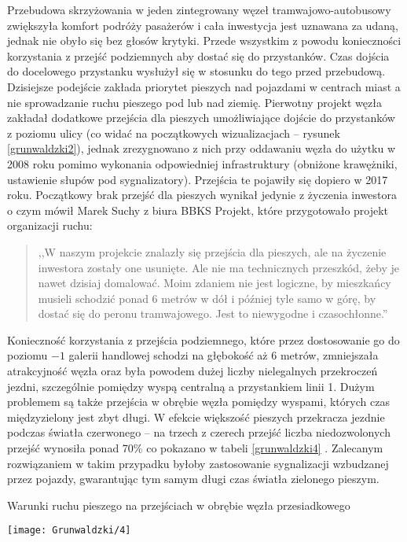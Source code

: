 \documentclass[twoside,12pt]{article}
\begin{document}
	Przebudowa skrzyżowania w jeden zintegrowany węzeł tramwajowo-autobusowy zwiększyła komfort podróży pasażerów i cała inwestycja jest uznawana za udaną, jednak nie obyło się bez głosów krytyki. Przede wszystkim z powodu konieczności korzystania z przejść podziemnych aby dostać się do przystanków. Czas dojścia do docelowego przystanku wysłużył się w stosunku do tego przed przebudową. Dzisiejsze podejście zakłada priorytet pieszych nad pojazdami w centrach miast a nie sprowadzanie ruchu pieszego pod lub nad ziemię. Pierwotny projekt węzła zakładał dodatkowe przejścia dla pieszych umożliwiające dojście do przystanków z poziomu ulicy (co widać na początkowych wizualizacjach -- rysunek \ref{grunwaldzki2}), jednak zrezygnowano z nich przy oddawaniu węzła do użytku w 2008 roku pomimo wykonania odpowiedniej infrastruktury (obniżone krawężniki, ustawienie słupów pod sygnalizatory). Przejścia te pojawiły się dopiero w 2017 roku. Początkowy brak przejść dla pieszych wynikał jedynie z życzenia inwestora o czym mówił Marek Suchy z biura BBKS Projekt, które przygotowało projekt organizacji ruchu:
	\begin{quote}
	,,W naszym projekcie znalazły się przejścia dla pieszych, ale na życzenie inwestora zostały one usunięte. Ale nie ma technicznych przeszkód, żeby je nawet dzisiaj domalować. Moim zdaniem nie jest logiczne, by mieszkańcy musieli schodzić ponad 6 metrów w dół i później tyle samo w górę, by dostać się do peronu tramwajowego. Jest to niewygodne i czasochłonne.”
	\end{quote}
	
	Konieczność korzystania z przejścia podziemnego, które przez dostosowanie go do poziomu $-1$ galerii handlowej schodzi na głębokość aż 6 metrów, zmniejszała atrakcyjność węzła oraz była powodem dużej liczby nielegalnych przekroczeń jezdni, szczególnie pomiędzy wyspą centralną a przystankiem linii 1. Dużym problemem są także przejścia w obrębie węzła pomiędzy wyspami, których czas międzyzielony jest zbyt długi. W efekcie większość pieszych przekracza jezdnie podczas światła czerwonego -- na trzech z czerech przejść liczba niedozwolonych przejść wynosiła ponad 70\% co pokazano w tabeli \ref{grunwaldzki4} \cite{grunwaldzki3}. Zalecanym rozwiązaniem w takim przypadku byłoby zastosowanie sygnalizacji wzbudzanej przez pojazdy, gwarantując tym samym długi czas światła zielonego pieszym. 
	
		\begin{table}[H]
		\centering
		\caption{Warunki ruchu pieszego na przejściach w obrębie węzła przesiadkowego}
		\texttt{[image: Grunwaldzki/4]}\\
		\label{grunwaldzki4}
	\end{table}	
\end{document}
